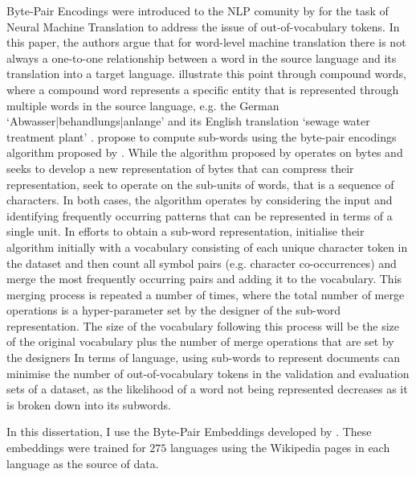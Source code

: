 Byte-Pair Encodings were introduced to the NLP comunity by \cite{Sennrich:2016} for the task of Neural Machine Translation to address the issue of out-of-vocabulary tokens. In this paper, the authors argue that for word-level machine translation there is not always a one-to-one relationship between a word in the source language and its translation into a target language. \citet{Sennrich:2016} illustrate this point through compound words, where a compound word represents a specific entity that is represented through multiple words in the source language, e.g. the German `Abwasser|behandlungs|anlange' and its English translation `sewage water treatment plant' \citep{Sennrich:2016}. 
\citet{Sennrich:2016} propose to compute sub-words using the byte-pair encodings algorithm proposed by \citet{Gage:1994}. While the algorithm proposed by \citet{Gage:1994} operates on bytes and seeks to develop a new representation of bytes that can compress their representation, \citet{Sennrich:2016} seek to operate on the sub-units of words, that is a sequence of characters. In both cases, the algorithm operates by considering the input and identifying frequently occurring patterns that can be represented in terms of a single unit.
In efforts to obtain a sub-word representation, \citet{Sennrich:2016} initialise their algorithm initially with a vocabulary consisting of each unique character token in the dataset and then count all symbol pairs (e.g. character co-occurrences) and merge the most frequently occurring pairs and adding it to the vocabulary. This merging process is repeated a number of times, where the total number of merge operations is a hyper-parameter set by the designer of the sub-word representation. The size of the vocabulary following this process will be the size of the original vocabulary plus the number of merge operations that are set by the designers \citep{Sennrich:2016}
In terms of language, using sub-words to represent documents can minimise the number of out-of-vocabulary tokens in the validation and evaluation sets of a dataset, as the likelihood of a word not being represented decreases as it is broken down into its subwords.

In this dissertation, I use the Byte-Pair Embeddings developed by \citet{Heinzerling:2018}. These embeddings were trained for $275$ languages using the Wikipedia pages in each language as the source of data.


